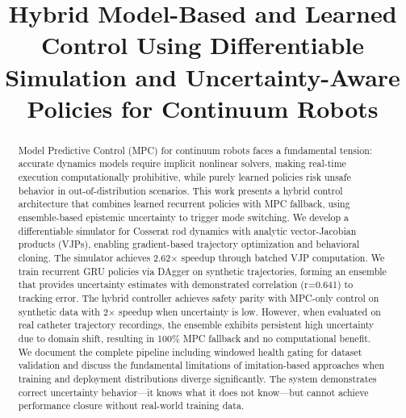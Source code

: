 \documentclass[conference]{IEEEtran}
\begin{document}
\title{Hybrid Model-Based and Learned Control Using Differentiable Simulation and Uncertainty-Aware Policies for Continuum Robots}

\author{
}

\maketitle

\begin{abstract}
Model Predictive Control (MPC) for continuum robots faces a fundamental tension: accurate dynamics models require implicit nonlinear solvers, making real-time execution computationally prohibitive, while purely learned policies risk unsafe behavior in out-of-distribution scenarios. This work presents a hybrid control architecture that combines learned recurrent policies with MPC fallback, using ensemble-based epistemic uncertainty to trigger mode switching. We develop a differentiable simulator for Cosserat rod dynamics with analytic vector-Jacobian products (VJPs), enabling gradient-based trajectory optimization and behavioral cloning. The simulator achieves 2.62$\times$ speedup through batched VJP computation. We train recurrent GRU policies via DAgger on synthetic trajectories, forming an ensemble that provides uncertainty estimates with demonstrated correlation (r=0.641) to tracking error. The hybrid controller achieves safety parity with MPC-only control on synthetic data with 2$\times$ speedup when uncertainty is low. However, when evaluated on real catheter trajectory recordings, the ensemble exhibits persistent high uncertainty due to domain shift, resulting in 100\% MPC fallback and no computational benefit. We document the complete pipeline including windowed health gating for dataset validation and discuss the fundamental limitations of imitation-based approaches when training and deployment distributions diverge significantly. The system demonstrates correct uncertainty behavior---it knows what it does not know---but cannot achieve performance closure without real-world training data.
\end{abstract}
\end{document}
